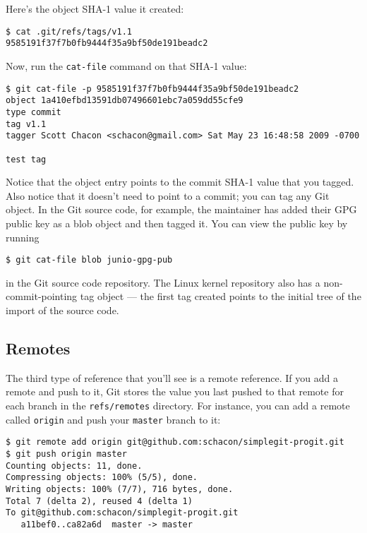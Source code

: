 \documentclass[a4paper]{book}
\begin{document}
Here's the object SHA-1 value it created:

\begin{shaded}\begin{verbatim}
$ cat .git/refs/tags/v1.1
9585191f37f7b0fb9444f35a9bf50de191beadc2
\end{verbatim}\end{shaded}

Now, run the \texttt{cat-file} command on that SHA-1 value:

\begin{shaded}\begin{verbatim}
$ git cat-file -p 9585191f37f7b0fb9444f35a9bf50de191beadc2
object 1a410efbd13591db07496601ebc7a059dd55cfe9
type commit
tag v1.1
tagger Scott Chacon <schacon@gmail.com> Sat May 23 16:48:58 2009 -0700

test tag
\end{verbatim}\end{shaded}

Notice that the object entry points to the commit SHA-1 value that you tagged. Also notice that it doesn't need to point to a commit; you can tag any Git object. In the Git source code, for example, the maintainer has added their GPG public key as a blob object and then tagged it. You can view the public key by running

\begin{shaded}\begin{verbatim}
$ git cat-file blob junio-gpg-pub
\end{verbatim}\end{shaded}

in the Git source code repository. The Linux kernel repository also has a non-commit-pointing tag object --- the first tag created points to the initial tree of the import of the source code.

\subsection{Remotes}

The third type of reference that you'll see is a remote reference. If you add a remote and push to it, Git stores the value you last pushed to that remote for each branch in the \texttt{refs/remotes} directory. For instance, you can add a remote called \texttt{origin} and push your \texttt{master} branch to it:

\begin{shaded}\begin{verbatim}
$ git remote add origin git@github.com:schacon/simplegit-progit.git
$ git push origin master
Counting objects: 11, done.
Compressing objects: 100% (5/5), done.
Writing objects: 100% (7/7), 716 bytes, done.
Total 7 (delta 2), reused 4 (delta 1)
To git@github.com:schacon/simplegit-progit.git
   a11bef0..ca82a6d  master -> master
\end{verbatim}\end{shaded}
\end{document}
